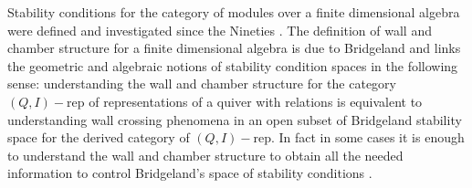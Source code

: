 \documentclass[11pt]{amsart}
\theoremstyle{definition}
\begin{document}
Stability conditions for the category of modules over a finite dimensional algebra were defined and investigated since the Nineties \cite{king}. The definition of wall and chamber structure for a finite dimensional algebra is due to Bridgeland \cite{bridgelandWC} and links the geometric and algebraic notions of stability condition spaces in the following sense: understanding the wall and chamber structure for the category $(Q,I)-\textrm{rep}$ of representations of a quiver with relations is equivalent to understanding wall crossing phenomena in an open subset of Bridgeland stability space for the derived category of $(Q,I)-\textrm{rep}$. In fact in some cases it is enough to understand the wall and chamber structure to obtain all the needed information to control Bridgeland's space of stability conditions \cite{bousseau}.
\end{document}
